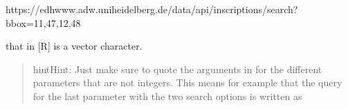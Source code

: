 \documentclass[a4paper,12pt,english]{sphinxhowto}
\begin{document}
\begin{sphinxVerbatim}[commandchars=\\\{\},formatcom=\footnotesize]
https://edh\PYGZhy{}www.adw.uni\PYGZhy{}heidelberg.de/data/api/inscriptions/search?bbox=11,47,12,48
\end{sphinxVerbatim}

that in {[}R{]} is a vector character.
\begin{quote}

\begin{sphinxadmonition}{hint}{Hint:}
Just make sure to quote the arguments in  for the different
parameters that are not integers. This means for example that the query
for the last parameter with the two search options is written as

\begin{sphinxVerbatim}[commandchars=\\\{\},formatcom=\footnotesize]
  
  
\end{sphinxVerbatim}
\end{sphinxadmonition}
\end{quote}

\end{document}
